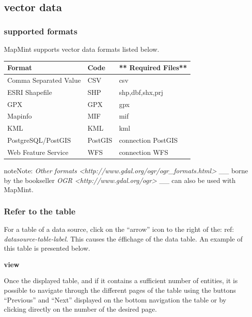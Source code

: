 \documentclass[letterpaper,10pt,english]{sphinxmanual}
\begin{document}
\subsection{vector data}
\label{data/datasources:donnees-vectorielles}

\subsubsection{supported formats}
\label{data/datasources:formats-supportes}
MapMint supports vector data formats listed below.

\begin{tabulary}{\linewidth}{|L|L|L|}
\hline

\textbf{Format}
 & 
\textbf{Code}
 & 
** Required  Files**
\\
\hline
Comma Separated Value
 & 
CSV
 & 
csv
\\
\hline
ESRI Shapefile
 & 
SHP
 & 
shp,dbf,shx,prj
\\
\hline
GPX
 & 
GPX
 & 
gpx
\\
\hline
Mapinfo
 & 
MIF
 & 
mif
\\
\hline
KML
 & 
KML
 & 
kml
\\
\hline
PostgreSQL/PostGIS
 & 
PostGIS
 & 
connection PostGIS
\\
\hline
Web Feature Service
 & 
WFS
 & 
connection WFS
\\
\hline\end{tabulary}


\begin{notice}{note}{Note:}
\emph{Other formats \textless{}http://www.gdal.org/ogr/ogr\_formats.html\textgreater{}} \_\_ borne by the bookseller \emph{OGR \textless{}http://www.gdal.org/ogr\textgreater{}} \_\_ can also be used with MapMint.
\end{notice}


\subsubsection{Refer to the table}
\label{data/datasources:consulter-la-table}
For a table of a data source, click on the ``arrow'' icon to the right of the: ref: \emph{datasource-table-label}. This causes the éffichage of the data table. An example of this table is presented below.

{\color{red}\bfseries{}\textbar{}view\textbar{}}

Once the displayed table, and if it contains a sufficient number of entities, it is possible to navigate through the different pages of the table using the buttons ``Previous'' and ``Next'' displayed on the bottom navigation the table or by clicking directly on the number of the desired page.
\end{document}
